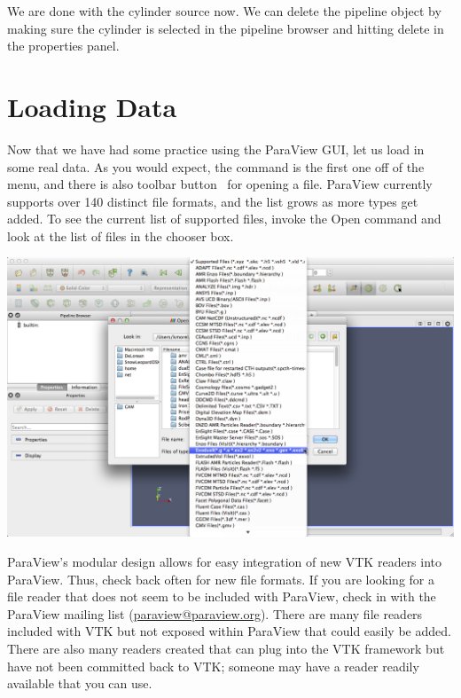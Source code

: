 
We are done with the cylinder source now.  We can delete the pipeline
object by making sure the cylinder is selected in the pipeline browser and
hitting  delete \delete in the properties panel.



\section{Loading Data}


Now that we have had some practice using the ParaView GUI, let us load in
some real data.  As you would expect, the   command
is the first one off of the  menu, and there is also toolbar
button~ for opening a file.  ParaView currently supports
over 140 distinct file formats, and the list grows as more types get
added.  To see the current list of supported files, invoke the Open command
and look at the list of files in the  chooser box.

\begin{inlinefig}
  \includegraphics[width=\scw]{images/OpenFileTypes}
\end{inlinefig}

ParaView's modular design allows for easy integration of new VTK readers
into ParaView.  Thus, check back often for new file formats.  If you are
looking for a file reader that does not seem to be included with ParaView,
check in with the ParaView mailing list
(\href{mailto:paraview@paraview.org}{paraview@paraview.org}).  There are
many file readers included with VTK but not exposed within ParaView that
could easily be added.  There are also many readers created that can plug
into the VTK framework but have not been committed back to VTK; someone may
have a reader readily available that you can use.

